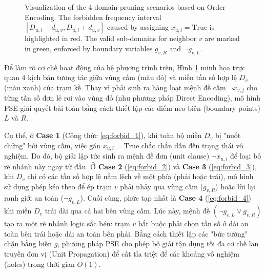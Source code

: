 \documentclass[letterpaper,journal]{IEEEtran}
\begin{document}
\begin{figure}[htbp]
\caption{Visualization of the 4 domain pruning scenarios based on Order Encoding. The forbidden frequency interval $[D_{u,i} - d_{u,v}, D_{u,i} + d_{u,v}]$ caused by assigning $x_{u,i} = \text{True}$ is highlighted in red. The valid sub-domains for neighbor $v$ are marked in green, enforced by boundary variables $g_{v,R}$ and $\neg g_{v,L}$.}
\label{fig:domain_pruning_cases}
\end{figure}

Để làm rõ cơ chế hoạt động của hệ phương trình trên, Hình \ref{fig:domain_pruning_cases} minh họa trực quan 4 kịch bản tương tác giữa vùng cấm (màu đỏ) và miền tần số hợp lệ $D_v$ (màu xanh) của trạm kề. Thay vì phải sinh ra hàng loạt mệnh đề cấm $\neg x_{v,j}$ cho từng tần số đơn lẻ rơi vào vùng đỏ (như phương pháp Direct Encoding), mô hình PSE giải quyết bài toán bằng cách thiết lập các điểm neo biên (boundary points) $L$ và $R$.

Cụ thể, ở \textbf{Case 1} (Công thức \ref{eq:forbid_1}), khi toàn bộ miền $D_v$ bị "nuốt chửng" bởi vùng cấm, việc gán $x_{u,i} = \text{True}$ chắc chắn dẫn đến trạng thái vô nghiệm. Do đó, bộ giải lập tức sinh ra mệnh đề đơn (unit clause) $\neg x_{u,i}$ để loại bỏ rẽ nhánh này ngay từ đầu. Ở \textbf{Case 2} (\ref{eq:forbid_2}) và \textbf{Case 3} (\ref{eq:forbid_3}), khi $D_v$ chỉ có các tần số hợp lệ nằm lệch về một phía (phải hoặc trái), mô hình sử dụng phép kéo theo để ép trạm $v$ phải nhảy qua vùng cấm ($g_{v,R}$) hoặc lùi lại ranh giới an toàn ($\neg g_{v,L}$). Cuối cùng, phức tạp nhất là \textbf{Case 4} (\ref{eq:forbid_4}) khi miền $D_v$ trải dài qua cả hai bên vùng cấm. Lúc này, mệnh đề $(\neg g_{v,L} \lor g_{v,R})$ tạo ra một rẽ nhánh logic sắc bén: trạm $v$ bắt buộc phải chọn tần số ở dải an toàn bên trái hoặc dải an toàn bên phải. Bằng cách thiết lập các "bức tường" chặn bằng biến $g$, phương pháp PSE cho phép bộ giải tận dụng tối đa cơ chế lan truyền đơn vị (Unit Propagation) để cắt tỉa triệt để các khoảng vô nghiệm (holes) trong thời gian $O(1)$.
\end{document}
